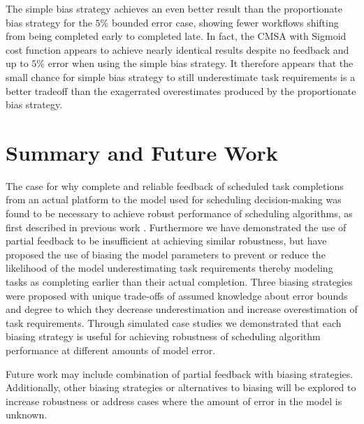 \documentclass[10pt]{csce}
\begin{document}
The simple bias strategy achieves an even better result than the proportionate
bias strategy for the $5\%$ bounded error case, showing fewer workflows
shifting from being completed early to completed late.  In fact, the CMSA with
Sigmoid cost function appears to achieve nearly identical results despite no
feedback and up to $5\%$ error when using the simple bias strategy.  It
therefore appears that the small chance for simple bias strategy to still
underestimate task requirements is a better tradeoff than the exagerrated
overestimates produced by the proportionate bias strategy.

\section{Summary and Future Work}
\label{sec:Summary}

The case for why complete and reliable feedback of scheduled task completions
from an actual platform to the model used for scheduling decision-making was
found to be necessary to achieve robust performance of scheduling algorithms,
as first described in previous work \cite{pdpta18}. Furthermore we have
demonstrated the use of partial feedback to be insufficient at achieving
similar robustness, but have proposed the use of biasing the model parameters
to prevent or reduce the likelihood of the model underestimating task
requirements thereby modeling tasks as completing earlier than their actual
completion. Three biasing strategies were proposed with unique trade-offs
of assumed knowledge about error bounds and degree to which they decrease
underestimation and increase overestimation of task requirements. Through
simulated case studies we demonstrated that each biasing strategy is useful
for achieving robustness of scheduling algorithm performance at different
amounts of model error.

Future work may include combination of partial feedback with biasing
strategies.  Additionally, other biasing strategies or alternatives to
biasing will be explored to increase robustness or address cases where
the amount of error in the model is unknown.


{}
\end{document}
